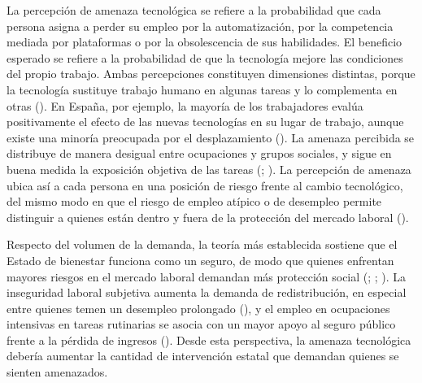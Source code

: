 \documentclass[
  spanish,
  12pt,
]{article}
\begin{document}
La percepción de amenaza tecnológica se refiere a la probabilidad que
cada persona asigna a perder su empleo por la automatización, por la
competencia mediada por plataformas o por la obsolescencia de sus
habilidades. El beneficio esperado se refiere a la probabilidad de que
la tecnología mejore las condiciones del propio trabajo. Ambas
percepciones constituyen dimensiones distintas, porque la tecnología
sustituye trabajo humano en algunas tareas y lo complementa en otras
(). En España, por ejemplo, la
mayoría de los trabajadores evalúa positivamente el efecto de las nuevas
tecnologías en su lugar de trabajo, aunque existe una minoría preocupada
por el desplazamiento (). La amenaza percibida se distribuye de manera desigual
entre ocupaciones y grupos sociales, y sigue en buena medida la
exposición objetiva de las tareas
(;
). La
percepción de amenaza ubica así a cada persona en una posición de riesgo
frente al cambio tecnológico, del mismo modo en que el riesgo de empleo
atípico o de desempleo permite distinguir a quienes están dentro y fuera
de la protección del mercado laboral
().

Respecto del volumen de la demanda, la teoría más establecida sostiene
que el Estado de bienestar funciona como un seguro, de modo que quienes
enfrentan mayores riesgos en el mercado laboral demandan más protección
social (;
;
). La inseguridad laboral
subjetiva aumenta la demanda de redistribución, en especial entre
quienes temen un desempleo prolongado
(), y el empleo en
ocupaciones intensivas en tareas rutinarias se asocia con un mayor apoyo
al seguro público frente a la pérdida de ingresos
().
Desde esta perspectiva, la amenaza tecnológica debería aumentar la
cantidad de intervención estatal que demandan quienes se sienten
amenazados.
\end{document}

